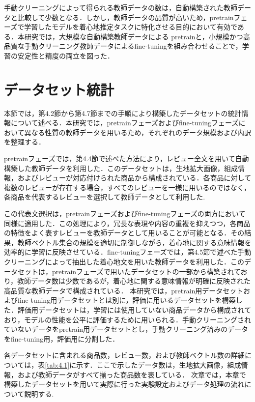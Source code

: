 \documentclass[a4paper,12pt]{jreport}
\begin{document}
手動クリーニングによって得られる教師データの数は，自動構築された教師データと比較して少数となる．しかし，教師データの品質が高いため，pretrainフェーズで学習したモデルを着心地推定タスクに特化させる目的において有効である．本研究では，大規模な自動構築教師データによる pretrainと，小規模かつ高品質な手動クリーニング教師データによるfine-tuningを組み合わせることで，学習の安定性と精度の両立を図った．


\section{データセット統計}
本節では，第4.2節から第4.7節までの手順により構築したデータセットの統計情報について述べる．本研究では，pretrainフェーズおよびfine-tuningフェーズにおいて異なる性質の教師データを用いるため，それぞれのデータ規模および内訳を整理する．

pretrainフェーズでは，第4.4節で述べた方法により，レビュー全文を用いて自動構築した教師データを利用した．このデータセットは，生地拡大画像，組成情報，およびレビューが対応付けられた商品から構成されている．各商品に対して複数のレビューが存在する場合，すべてのレビューを一様に用いるのではなく，各商品を代表するレビューを選択して教師データとして利用した. 

この代表文選択は，pretrainフェーズおよびfine-tuningフェーズの両方において同様に適用した．この処理により，冗長な表現や内容の重複を抑えつつ，各商品の特徴をよく表すレビューを教師データとして用いることが可能となる．その結果，教師ベクトル集合の規模を適切に制御しながら，着心地に関する意味情報を効率的に学習に反映させている．fine-tuningフェーズでは，第4.5節で述べた手動クリーニングによって抽出した着心地文を用いた教師データを利用した．このデータセットは，pretrainフェーズで用いたデータセットの一部から構築されており，教師データ数は少数であるが，着心地に関する意味情報が明確に反映された高品質な教師データで構成されている．
本研究では，pretrain用データセットおよびfine-tuning用データセットとは別に，評価に用いるデータセットを構築した．評価用データセットは，学習には使用していない商品データから構成されており，モデルの性能を公平に評価するために用いられる．手動クリーニングされていないデータをpretrain用データセットとし，手動クリーニング済みのデータをfine-tuning用，評価用に分割した．

各データセットに含まれる商品数，レビュー数，および教師ベクトル数の詳細については，表\ref{tab:4.1}に示す．ここで示したデータ数は，生地拡大画像，組成情報，および教師データがすべて揃った商品数を表している．
次章では，本章で構築したデータセットを用いて実際に行った実験設定およびデータ処理の流れについて説明する.
\end{document}
